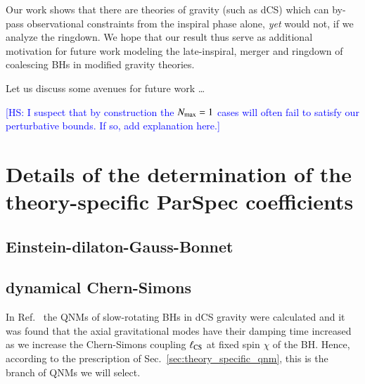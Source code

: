 \documentclass[twocolumn,
               prd,
               aps,
               superscriptaddress,
               tightenlines,
               nofootinbib,
               eqsecnum,
               amsfonts,
               amsmath,
               longbibliography]{revtex4-1}
\newcommand{\hs}[1]{{\textcolor{blue}{{[HS: #1]}} }}
\begin{document}
Our work shows that there are theories of gravity (such as dCS) which can by-pass observational
constraints from the inspiral phase alone, {\it yet} would not, if we
analyze the ringdown.
%
We hope that our result thus serve as additional motivation for future work
modeling the late-inspiral, merger and ringdown of coalescing BHs in modified
gravity theories.

Let us discuss some avenues for future work \dots

\hs{I suspect that by construction the $N_{\rm max} = 1$ cases will often fail to satisfy our
perturbative bounds. If so, add explanation here.}

%

\appendix

\section{Details of the determination of the theory-specific
ParSpec coefficients}
\label{app:map_details}

\subsection{Einstein-dilaton-Gauss-Bonnet}
\label{app:map_edgb}

\subsection{dynamical Chern-Simons}
\label{app:map_dcs}

%
In Ref.~\cite{Wagle:2021tam} the QNMs of slow-rotating BHs in dCS gravity were calculated
and it was found that the axial gravitational modes have their damping time increased as we
increase the Chern-Simons coupling $\ell_{\rm CS}$ at fixed spin $\chi$ of the BH.
%
Hence, according to the prescription of Sec.~\ref{sec:theory_specific_qnm}, this is the branch of QNMs we will select.
\end{document}
